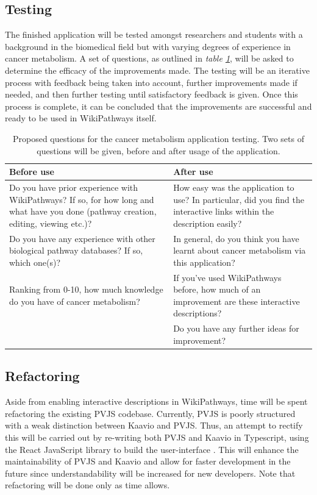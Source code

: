 \documentclass[a4paper,12pt,twoside]{apa}
\begin{document}
\FloatBarrier
\subsection{Testing}
The finished application will be tested amongst researchers and students with a background in the biomedical field but with varying degrees of experience in cancer metabolism. A set of questions, as outlined in \textit{table \ref{tbl:test-questions}}, will be asked to determine the efficacy of the improvements made. The testing will be an iterative process with feedback being taken into account, further improvements made if needed, and then further testing until satisfactory feedback is given. Once this process is complete, it can be concluded that the improvements are successful and ready to be used in WikiPathways itself.

\begin{table}[h]
  \centering
  \caption{Proposed questions for the cancer metabolism application testing. Two sets of questions will be given, before and after usage of the application.}
  \label{tbl:test-questions}
    \begin{tabularx}{0.9\textwidth}{|X|X|}
      \hline
      \textbf{Before use}
      &
      \textbf{After use}
      \\ \hline
      Do you have prior experience with WikiPathways? If so, for how long and what have you done (pathway creation, editing, viewing etc.)?
      &
      How easy was the application to use? In particular, did you find the interactive links within the description easily?
      \\ \hline
      Do you have any experience with other biological pathway databases? If so, which one(s)?
      &
      In general, do you think you have learnt about cancer metabolism via this application?
      \\ \hline
      Ranking from 0-10, how much knowledge do you have of cancer metabolism?
      &
      If you've used WikiPathways before, how much of an improvement are these interactive descriptions?
      \\ \hline
      &
      Do you have any further ideas for improvement?
      \\ \hline

    \end{tabularx}
\end{table}

\FloatBarrier
\subsection{Refactoring}
Aside from enabling interactive descriptions in WikiPathways, time will be spent refactoring the existing PVJS codebase. Currently, PVJS is poorly structured with a weak distinction between Kaavio and PVJS. Thus, an attempt to rectify this will be carried out by re-writing both PVJS and Kaavio in Typescript, using the React JavaScript library to build the user-interface \cite{React, Typescript}. This will enhance the maintainability of PVJS and Kaavio and allow for faster development in the future since understandability will be increased for new developers. Note that refactoring will be done only as time allows.
\end{document}
